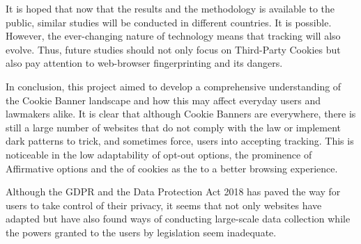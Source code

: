 \documentclass[../main.tex]{subfiles}
\begin{document}
It is hoped that now that the results and the methodology is available to the public, similar studies will be conducted in different countries. It is possible. However, the ever-changing nature of technology means that tracking will also evolve. Thus, future studies should not only focus on Third-Party Cookies but also pay attention to web-browser fingerprinting and its dangers. 

In conclusion, this project aimed to develop a comprehensive understanding of the Cookie Banner landscape and how this may affect everyday users and lawmakers alike. It is clear that although Cookie Banners are everywhere, there is still a large number of websites that do not comply with the law or implement dark patterns to trick, and sometimes force, users into accepting tracking. This is noticeable in the low adaptability of opt-out options, the prominence of Affirmative options and the  of cookies as the  to a better browsing experience. 

Although the GDPR and the Data Protection Act 2018 has paved the way for users to take control of their privacy, it seems that not only websites have adapted but have also found ways of conducting large-scale data collection while the powers granted to the users by legislation seem inadequate. 
  
\end{document}
